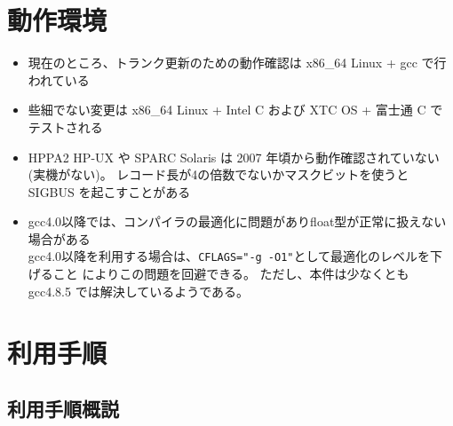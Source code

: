 
\section{動作環境}

\begin{itemize}
\item 現在のところ、トランク更新のための動作確認は
	x86\_64 Linux + gcc で行われている
\item 些細でない変更は x86\_64 Linux + Intel C および XTC OS + 富士通 C でテストされる
\item HPPA2 HP-UX や SPARC Solaris は
	2007 年頃から動作確認されていない (実機がない)。
	レコード長が4の倍数でないかマスクビットを使うと
	SIGBUS を起こすことがある
\item gcc4.0以降では、コンパイラの最適化に問題がありfloat型が正常に扱えない場合がある\\
	gcc4.0以降を利用する場合は、\verb|CFLAGS="-g -O1"|として最適化のレベルを下げること
	によりこの問題を回避できる。
      ただし、本件は少なくとも gcc4.8.5 では解決しているようである。
\end{itemize}

\section{利用手順}

\subsection{利用手順概説}

